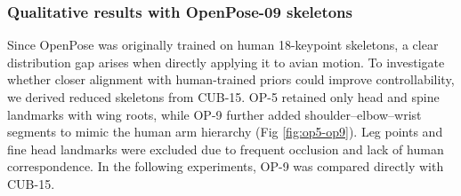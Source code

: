\documentclass[final-report]{report-template}
\begin{document}
\subsubsection{Qualitative results with OpenPose-09 skeletons}





Since OpenPose was originally trained on human 18-keypoint skeletons, a clear distribution gap arises when directly applying it to avian motion. 
To investigate whether closer alignment with human-trained priors could improve controllability, we derived reduced skeletons from CUB-15. 
OP-5 retained only head and spine landmarks with wing roots, while OP-9 further added shoulder--elbow--wrist segments to mimic the human arm hierarchy (Fig \ref{fig:op5-op9}). 
Leg points and fine head landmarks were excluded due to frequent occlusion and lack of human correspondence. 
In the following experiments, OP-9 was compared directly with CUB-15.  
\end{document}
